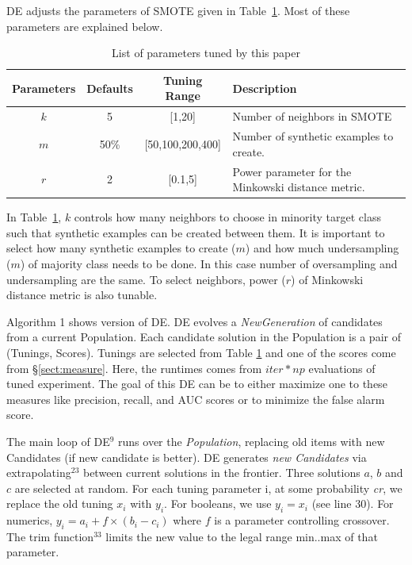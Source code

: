 \documentclass[sigconf,review, anonymous]{acmart}
\theoremstyle{break}
\theoremstyle{break}
\newcommand{\tion}[1]{{\S}\ref{sect:#1}}
\begin{document}
DE  adjusts the parameters of SMOTE given in
Table~\ref{tb:tuned}. Most of these parameters are explained below. 

\begin{table}[!htbp]
    \begin{center}
\scriptsize
\begin{tabular}{|c|c|c|p{3.5cm}|}
        \hline 
        \textbf{Parameters} & \textbf{Defaults} & \textbf{Tuning Range} & \textbf{Description}\\
        \hline
        $k$ & 5 & [1,20] & Number of neighbors in SMOTE \\ 
        \hline
       $m$ & 50\% & [50,100,200,400] & Number of synthetic examples to create. \\ 
        \hline
        $r$ & 2 & [0.1,5] & Power parameter for the Minkowski distance metric.\\

        \hline
\end{tabular}
\end{center}
\caption{List of parameters tuned by this paper}
\label{tb:tuned}
\end{table}
 
In Table~\ref{tb:tuned}, $k$ controls how many neighbors to choose in minority target class such that synthetic examples can be created between them. It is important to select how many synthetic examples to create ($m$) and how much undersampling ($m$) of majority class needs to be done. In this case number of oversampling and undersampling are the same. To select neighbors, power ($r$) of Minkowski distance metric is also tunable.

Algorithm 1 shows version of DE.  DE evolves a \textit{NewGeneration} of
candidates from a current Population.   Each candidate solution in the Population is a pair of
(Tunings, Scores). Tunings are selected from Table \ref{tb:tuned} and one of the scores
come from \tion{measure}. Here, the runtimes comes from $\mathit{iter} * np $ evaluations of tuned experiment. The goal of this DE can be to either maximize one to these measures like precision, recall, and AUC scores or to minimize the false alarm score.

The main loop of DE$^{9}$ runs over the \textit{Population}, replacing old items with new Candidates (if new candidate is better).
DE generates \textit{new Candidates} via 
extrapolating$^{23}$ between current solutions in the frontier. Three solutions $a$, $b$ and $c$ are
selected at random. For each tuning parameter i, at some probability \textit{cr}, we
replace the old tuning $x_i$ with $y_i$. For booleans, we use $y_i = x_i$ (see
line 30). For numerics, $y_i = a_i + f \times (b_i - c_i)$ where $f$ is a
parameter controlling crossover. The trim function$^{33}$ limits the new value
to the legal range min..max of that parameter.
\end{document}

